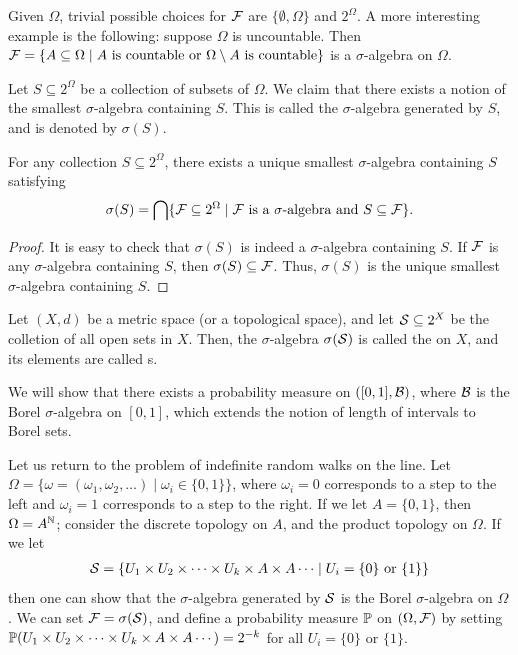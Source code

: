 \begin{example}
    Given $\Omega$, trivial possible choices for $\mathcal{F}$ are $\{\emptyset,\Omega\}$ and $2^{\Omega}$. A more interesting example is the following: suppose $\Omega$ is uncountable. Then $\mathcal{F} = \{A \subseteq \Omega \mid A \text{ is countable or } \Omega \setminus A \text{ is countable}\}$ is a $\sigma$-algebra on $\Omega$.
\end{example}

Let $S \subseteq 2^{\Omega}$ be a collection of subsets of $\Omega$. We claim that there exists a notion of the smallest $\sigma$-algebra containing $S$. This is called the $\sigma$-algebra generated by $S$, and is denoted by $\sigma(S)$.

\begin{lemma}
    For any collection $S \subseteq 2^{\Omega}$, there exists a unique smallest $\sigma$-algebra containing $S$ satisfying
    \begin{align}
        \sigma(S) = \bigcap \{\mathcal{F} \subseteq 2^{\Omega} \mid \mathcal{F} \text{ is a $\sigma$-algebra and } S \subseteq \mathcal{F}\}.
    \end{align}
\end{lemma}
\begin{proof}
    It is easy to check that $\sigma(S)$ is indeed a $\sigma$-algebra containing $S$. If $\mathcal{F}$ is any $\sigma$-algebra containing $S$, then $\sigma(S) \subseteq \mathcal{F}$. Thus, $\sigma(S)$ is the unique smallest $\sigma$-algebra containing $S$.
\end{proof}

\begin{definition}
    Let $(X,d)$ be a metric space (or a topological space), and let $\mathcal{S} \subseteq 2^{X}$ be the colletion of all open sets in $X$. Then, the $\sigma$-algebra $\sigma(\mathcal{S})$ is called the  on $X$, and its elements are called s.
\end{definition}
We will show that there exists a probability measure on $([0,1],\mathcal{B})$, where $\mathcal{B}$ is the Borel $\sigma$-algebra on $[0,1]$, which extends the notion of length of intervals to Borel sets.

Let us return to the problem of indefinite random walks on the line. Let $\Omega = \{\omega = (\omega_{1},\omega_{2},\ldots) \mid \omega_{i} \in \{0,1\}\}$, where $\omega_{i} = 0$ corresponds to a step to the left and $\omega_{i} = 1$ corresponds to a step to the right. If we let $A = \{0,1\}$, then $\Omega = A^{\mathbb{N}}$; consider the discrete topology on $A$, and the product topology on $\Omega$. If we let
\begin{align}
    \mathcal{S} = \{U_{1} \times U_{2} \times \cdots \times U_{k} \times A \times A \cdots \mid U_{i} = \{0\} \text{ or } \{1\}\}
\end{align}
then one can show that the $\sigma$-algebra generated by $\mathcal{S}$ is the Borel $\sigma$-algebra on $\Omega$. We can set $\mathcal{F} = \sigma(\mathcal{S})$, and define a probability measure $\mathbb{P}$ on $(\Omega,\mathcal{F})$ by setting $\mathbb{P}(U_{1} \times U_{2} \times \cdots \times U_{k} \times A \times A \cdots) = 2^{-k}$ for all $U_{i} = \{0\}$ or $\{1\}$.
\\

